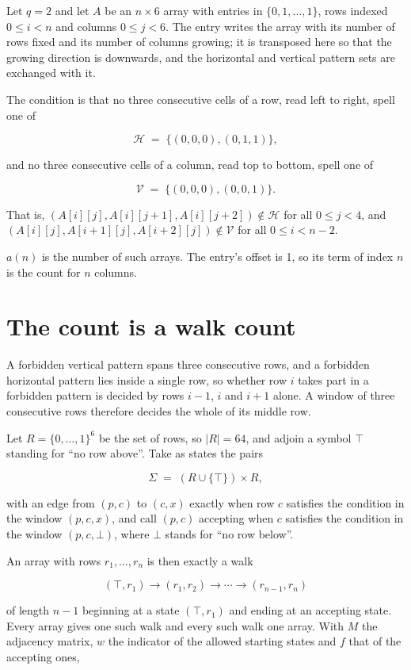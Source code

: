 \documentclass[11pt]{article}
\theoremstyle{definition}
\begin{document}
Let $q = 2$ and let $A$ be an $n \times 6$ array with entries in $\{0,1,\dots,1\}$, rows indexed $0 \le i < n$ and columns $0 \le j < 6$. The entry writes the array with its number of rows fixed and its number of columns growing; it is transposed here so that the growing direction is downwards, and the horizontal and vertical pattern sets are exchanged with it.

The condition is that no three consecutive cells of a row, read left to right, spell one of

\[\mathcal{H} \;=\; \{(0,0,0), (0,1,1)\},\]

and no three consecutive cells of a column, read top to bottom, spell one of

\[\mathcal{V} \;=\; \{(0,0,0), (0,0,1)\}.\]

That is, $(A[i][j],A[i][j{+}1],A[i][j{+}2]) \notin \mathcal{H}$ for all $0 \le j < 4$, and $(A[i][j],A[i{+}1][j],A[i{+}2][j]) \notin \mathcal{V}$ for all $0 \le i < n-2$.

$a(n)$ is the number of such arrays. The entry's offset is 1, so its term of index $n$ is the count for $n$ columns.

\section{The count is a walk count}

A forbidden vertical pattern spans three consecutive rows, and a forbidden horizontal pattern lies inside a single row, so whether row $i$ takes part in a forbidden pattern is decided by rows $i-1$, $i$ and $i+1$ alone. A window of three consecutive rows therefore decides the whole of its middle row.

Let $R = \{0,\dots,1\}^{6}$ be the set of rows, so $|R| = 64$, and adjoin a symbol $\top$ standing for ``no row above''. Take as states the pairs

\[\Sigma \;=\; (R \cup \{\top\}) \times R,\]

with an edge from $(p,c)$ to $(c,x)$ exactly when row $c$ satisfies the condition in the window $(p,c,x)$, and call $(p,c)$ accepting when $c$ satisfies the condition in the window $(p,c,\bot)$, where $\bot$ stands for ``no row below''.

An array with rows $r_1,\dots,r_n$ is then exactly a walk

\[(\top,r_1) \to (r_1,r_2) \to \cdots \to (r_{n-1},r_n)\]

of length $n-1$ beginning at a state $(\top,r_1)$ and ending at an accepting state. Every array gives one such walk and every such walk one array. With $M$ the adjacency matrix, $w$ the indicator of the allowed starting states and $f$ that of the accepting ones,
\end{document}
